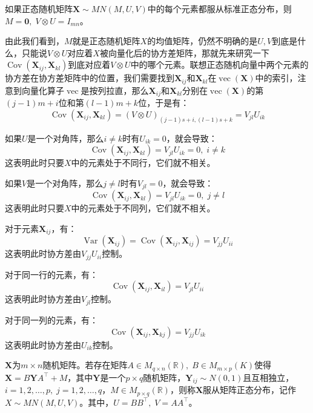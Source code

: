 \begin{corollary}
	如果正态随机矩阵$\mathbf{X}\sim MN(M,U,V)$中的每个元素都服从标准正态分布，则$M=\mathbf{0},\;V\otimes U=I_{mn}$。
\end{corollary}
由此我们看到，$M$就是正态随机矩阵$X$的均值矩阵，仍然不明确的是$U,V$到底是什么，只能说$V\otimes U$对应着$X$被向量化后的协方差矩阵，那就先来研究一下$\operatorname{Cov}(\mathbf{X}_{ij},\mathbf{X}_{kl})$到底对应着$V\otimes U$中的哪个元素。联想正态随机向量中两个元素的协方差在协方差矩阵中的位置，我们需要找到$\mathbf{X}_{ij}$和$\mathbf{X}_{kl}$在$\operatorname{vec}(\mathbf{X})$中的索引，注意到向量化算子$\operatorname{vec}$是按列拉直，那么$\mathbf{X}_{ij}$和$\mathbf{X}_{kl}$分别在$\operatorname{vec}(\mathbf{X})$的第$(j-1)m+i$位和第$(l-1)m+k$位，于是有：
\begin{equation*}
	\operatorname{Cov}(\mathbf{X}_{ij},\mathbf{X}_{kl})=(V\otimes U)_{(j-1)s+i,(l-1)s+k}=V_{jl}U_{ik}
\end{equation*}\par
如果$U$是一个对角阵，那么$i\ne k$时有$U_{ik}=0$，就会导致：
\begin{equation*}
	\operatorname{Cov}(\mathbf{X}_{ij},\mathbf{X}_{kl})=V_{jl}U_{ik}=0,\;i\ne k
\end{equation*}
这表明此时只要$X$中的元素处于不同行，它们就不相关。\par
如果$V$是一个对角阵，那么$j\ne l$时有$V_{jl}=0$，就会导致：
\begin{equation*}
	\operatorname{Cov}(\mathbf{X}_{ij},\mathbf{X}_{kl})=V_{jl}U_{ik}=0,\;j\ne l
\end{equation*}
这表明此时只要$X$中的元素处于不同列，它们就不相关。\par
对于元素$\mathbf{X}_{ij}$，有：
\begin{equation*}
	\operatorname{Var}(\mathbf{X}_{ij})=\operatorname{Cov}(\mathbf{X}_{ij},\mathbf{X}_{ij})=V_{jj}U_{ii}
\end{equation*}
这表明此时协方差由$V_{jj}U_{ii}$控制。\par
对于同一行的元素，有：
\begin{equation*}
	\operatorname{Cov}(\mathbf{X}_{ij},\mathbf{X}_{il})=V_{jl}U_{ii}
\end{equation*}
这表明此时协方差由$V_{jl}$控制。\par
对于同一列的元素，有：
\begin{equation*}
	\operatorname{Cov}(\mathbf{X}_{ij},\mathbf{X}_{kj})=V_{jj}U_{ik}
\end{equation*}
这表明此时协方差由$U_{ik}$控制。
\begin{definition}\label{def:MatNormal3}
	$\mathbf{X}$为$m\times n$随机矩阵。若存在矩阵$A\in M_{q\times n}(\mathbb{R}),\;B\in M_{m\times p}(K)$使得$\mathbf{X}=B\mathbf{Y}A^{\top}+M$，其中$\mathbf{Y}$是一个$p\times q$随机矩阵，$\mathbf{Y}_{ij}\sim N(0,1)$且互相独立，$i=1,2,\dots,p,\;j=1,2,\dots,q$，$M\in M_{p\times q}(\mathbb{R})$，则称$\mathbf{X}$服从矩阵正态分布，记作$X\sim MN(M,U,V)$。其中，$U=BB^{\top},\;V=AA^{\top}$。
\end{definition}
